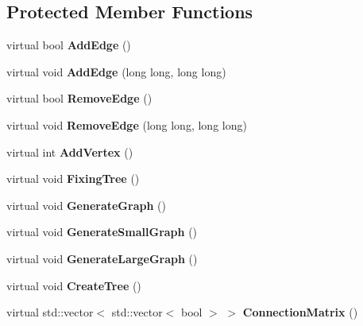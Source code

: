 \subsection*{Protected Member Functions}
\begin{DoxyCompactItemize}
\item 
\mbox{\label{class_graph_a3b4b055070a248a8193798e8803f2db8}} 
virtual bool {\bfseries Add\+Edge} ()
\item 
\mbox{\label{class_graph_a3f66bad284c375082f8167894949e536}} 
virtual void {\bfseries Add\+Edge} (long long, long long)
\item 
\mbox{\label{class_graph_ae58a11f973b4cb293613e97bad254860}} 
virtual bool {\bfseries Remove\+Edge} ()
\item 
\mbox{\label{class_graph_aa60add58a21bd65da45035e325dfa5dd}} 
virtual void {\bfseries Remove\+Edge} (long long, long long)
\item 
\mbox{\label{class_graph_ac7dced2a44ff221d1b0c64d84cd0d11a}} 
virtual int {\bfseries Add\+Vertex} ()
\item 
\mbox{\label{class_graph_a062db0193f1181276b909679b8cb9a48}} 
virtual void {\bfseries Fixing\+Tree} ()
\item 
\mbox{\label{class_graph_a94808d2f0658d53848833c41e38f49a7}} 
virtual void {\bfseries Generate\+Graph} ()
\item 
\mbox{\label{class_graph_a542e1c26b57a0db7a34e81780cd71135}} 
virtual void {\bfseries Generate\+Small\+Graph} ()
\item 
\mbox{\label{class_graph_a1431632c345eb1130003f3e92d8b1bd0}} 
virtual void {\bfseries Generate\+Large\+Graph} ()
\item 
\mbox{\label{class_graph_ad30e94ed85db8caa690617f235ce43ff}} 
virtual void {\bfseries Create\+Tree} ()
\item 
\mbox{\label{class_graph_aaa7392fb83b5c2fc76296ba6778ec479}} 
virtual std\+::vector$<$ std\+::vector$<$ bool $>$ $>$ {\bfseries Connection\+Matrix} ()

\end{DoxyCompactItemize}
